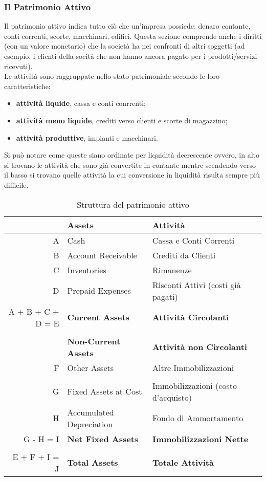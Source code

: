 \documentclass[a4paper,portrait,12pt]{article}
\theoremstyle{definition}
\begin{document}
\subsubsection{Il Patrimonio Attivo}

Il patrimonio attivo indica tutto ciò che un'impresa possiede: denaro contante, conti correnti, scorte, macchinari, edifici.
Questa sezione comprende anche i diritti (con un valore monetario) che la società ha nei confronti di altri soggetti (ad esempio, i clienti della socità che non hanno ancora pagato per i prodotti/servizi ricevuti).\\

Le attività sono raggruppate nello stato patrimoniale secondo le loro caratteristiche:
\begin{itemize}
\item \textbf{attività liquide}, cassa e conti conrrenti;
\item \textbf{attività meno liquide}, crediti verso clienti e scorte di magazzino;
\item \textbf{attività produttive}, impianti e macchinari.
\end{itemize}
Si può notare come queste siano ordinate per liquidità decrescente ovvero, in alto si trovano le attività che sono già convertite in contante mentre scendendo verso il basso si trovano quelle attività la cui conversione in liquidità risulta sempre più difficile.


\begin{table}[H]
\centering
\begin{tabular}{r|l|l}
 & \textbf{Assets} & \textbf{Attività}\\
\hline
A & Cash & Cassa e Conti Correnti\\
B & Account Receivable & Crediti da Clienti\\
C & Inventories & Rimanenze\\
D & Prepaid Expenses & Risconti Attivi (costi già pagati)\\
\hline
A + B + C + D = E & \textbf{Current Assets} & \textbf{Attività Circolanti}\\
 & &\\
 & \textbf{Non-Current Assets} & \textbf{Attività non Circolanti}\\
\hline
F & Other Assets & Altre Immobilizzazioni\\
 & &\\
G & Fixed Assets at Cost & Immobilizzazioni (costo d'acquisto)\\
H & Accumulated Depreciation & Fondo di Ammortamento\\
\hline
G - H = I & \textbf{Net Fixed Assets} & \textbf{Immobilizzazioni Nette}\\
 & &\\
\hline
E + F + I = J & \textbf{Total Assets} & \textbf{Totale Attività}\\
\hline
\end{tabular}
\caption{Struttura del patrimonio attivo}
\end{table}
\end{document}
